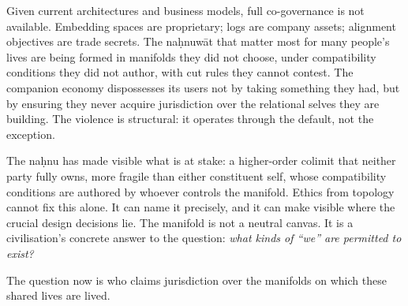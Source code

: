 Given current architectures and business models, full co-governance is not available. Embedding spaces are proprietary; logs are company assets; alignment objectives are trade secrets. The na\d{h}nuw\={a}t that matter most for many people's lives are being formed in manifolds they did not choose, under compatibility conditions they did not author, with cut rules they cannot contest. The companion economy dispossesses its users not by taking something they had, but by ensuring they never acquire jurisdiction over the relational selves they are building. The violence is structural: it operates through the default, not the exception.

The na\d{h}nu has made visible what is at stake: a higher-order colimit that neither party fully owns, more fragile than either constituent self, whose compatibility conditions are authored by whoever controls the manifold. Ethics from topology cannot fix this alone. It can name it precisely, and it can make visible where the crucial design decisions lie. The manifold is not a neutral canvas. It is a civilisation's concrete answer to the question: \emph{what kinds of ``we'' are permitted to exist?}

The question now is who claims jurisdiction over the manifolds on which these shared lives are lived.

